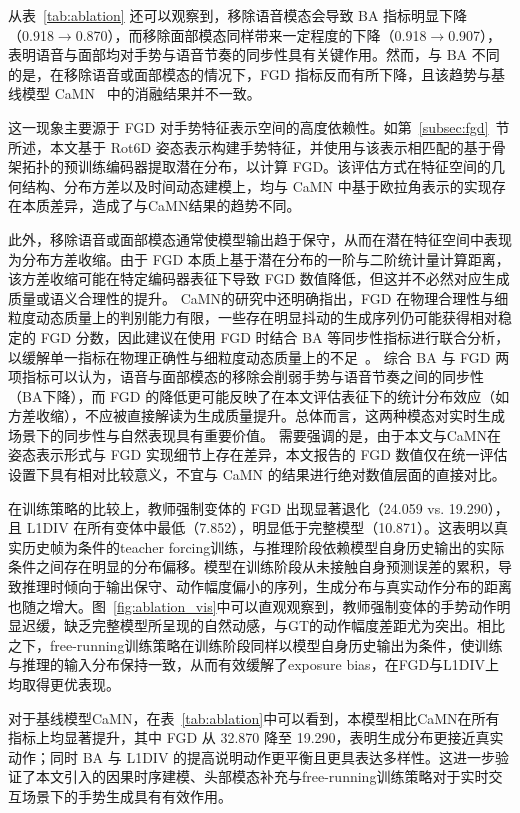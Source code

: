 从表~\ref{tab:ablation} 还可以观察到，移除语音模态会导致 BA 指标明显下降（0.918$\rightarrow$0.870），而移除面部模态同样带来一定程度的下降（0.918$\rightarrow$0.907），表明语音与面部均对手势与语音节奏的同步性具有关键作用。然而，与 BA 不同的是，在移除语音或面部模态的情况下，FGD 指标反而有所下降，且该趋势与基线模型 CaMN~\cite{beatcamn} 中的消融结果并不一致。

这一现象主要源于 FGD 对手势特征表示空间的高度依赖性。如第~\ref{subsec:fgd}~节所述，本文基于 Rot6D 姿态表示构建手势特征，并使用与该表示相匹配的基于骨架拓扑的预训练编码器提取潜在分布，以计算 FGD。该评估方式在特征空间的几何结构、分布方差以及时间动态建模上，均与 CaMN 中基于欧拉角表示的实现存在本质差异，造成了与CaMN结果的趋势不同。

此外，移除语音或面部模态通常使模型输出趋于保守，从而在潜在特征空间中表现为分布方差收缩。由于 FGD 本质上基于潜在分布的一阶与二阶统计量计算距离，该方差收缩可能在特定编码器表征下导致 FGD 数值降低，但这并不必然对应生成质量或语义合理性的提升。
CaMN的研究中还明确指出，FGD 在物理合理性与细粒度动态质量上的判别能力有限，一些存在明显抖动的生成序列仍可能获得相对稳定的 FGD 分数，因此建议在使用 FGD 时结合 BA 等同步性指标进行联合分析，以缓解单一指标在物理正确性与细粒度动态质量上的不足~\cite{beatcamn}。
综合 BA 与 FGD 两项指标可以认为，语音与面部模态的移除会削弱手势与语音节奏之间的同步性（BA下降），而 FGD 的降低更可能反映了在本文评估表征下的统计分布效应（如方差收缩），不应被直接解读为生成质量提升。总体而言，这两种模态对实时生成场景下的同步性与自然表现具有重要价值。
需要强调的是，由于本文与CaMN在姿态表示形式与 FGD 实现细节上存在差异，本文报告的 FGD 数值仅在统一评估设置下具有相对比较意义，不宜与 CaMN 的结果进行绝对数值层面的直接对比。

在训练策略的比较上，教师强制变体的 FGD 出现显著退化（24.059 vs. 19.290），且 L1DIV 在所有变体中最低（7.852），明显低于完整模型（10.871）。这表明以真实历史帧为条件的teacher forcing训练，与推理阶段依赖模型自身历史输出的实际条件之间存在明显的分布偏移。模型在训练阶段从未接触自身预测误差的累积，导致推理时倾向于输出保守、动作幅度偏小的序列，生成分布与真实动作分布的距离也随之增大。图~\ref{fig:ablation_vis}中可以直观观察到，教师强制变体的手势动作明显迟缓，缺乏完整模型所呈现的自然动感，与GT的动作幅度差距尤为突出。相比之下，free-running训练策略在训练阶段同样以模型自身历史输出为条件，使训练与推理的输入分布保持一致，从而有效缓解了exposure bias，在FGD与L1DIV上均取得更优表现。

对于基线模型CaMN，在表~\ref{tab:ablation}中可以看到，本模型相比CaMN在所有指标上均显著提升，其中 FGD 从 32.870 降至 19.290，表明生成分布更接近真实动作；同时 BA 与 L1DIV 的提高说明动作更平衡且更具表达多样性。这进一步验证了本文引入的因果时序建模、头部模态补充与free-running训练策略对于实时交互场景下的手势生成具有有效作用。

